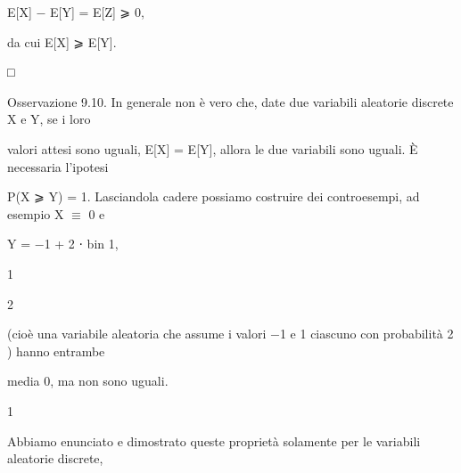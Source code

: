 \documentclass[a4paper,portrait,12pt]{article}
\begin{document}
\begin{flushleft}
E[X] $-$ E[Y] = E[Z] ⩾ 0,
\end{flushleft}


\begin{flushleft}
da cui E[X] ⩾ E[Y].
\end{flushleft}





□





\begin{flushleft}
Osservazione 9.10. In generale non \`{e} vero che, date due variabili aleatorie discrete X e Y, se i loro
\end{flushleft}


\begin{flushleft}
valori attesi sono uguali, E[X] = E[Y], allora le due variabili sono uguali. \`{E} necessaria l'ipotesi
\end{flushleft}


\begin{flushleft}
P(X ⩾ Y) = 1. Lasciandola cadere possiamo costruire dei controesempi, ad esempio X $\equiv$ 0 e
\end{flushleft}


\begin{flushleft}
Y = $-$1 + 2 ⋅ bin 1,
\end{flushleft}





1


2





\begin{flushleft}
(cio\`{e} una variabile aleatoria che assume i valori $-$1 e 1 ciascuno con probabilit\`{a} 2 ) hanno entrambe
\end{flushleft}


\begin{flushleft}
media 0, ma non sono uguali.
\end{flushleft}


1





\begin{flushleft}
Abbiamo enunciato e dimostrato queste propriet\`{a} solamente per le variabili aleatorie discrete,
\end{flushleft}
\end{document}

